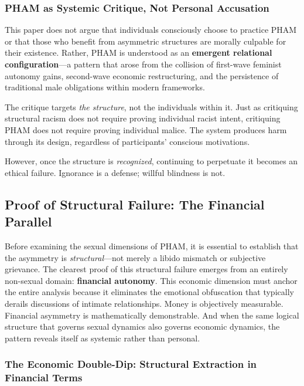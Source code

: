 \documentclass[12pt, letterpaper]{article}
\begin{document}
\subsubsection{PHAM as Systemic Critique, Not Personal Accusation}

This paper does not argue that individuals consciously choose to practice PHAM or that those who benefit from asymmetric structures are morally culpable for their existence. Rather, PHAM is understood as an \textbf{emergent relational configuration}---a pattern that arose from the collision of first-wave feminist autonomy gains, second-wave economic restructuring, and the persistence of traditional male obligations within modern frameworks.

The critique targets \textit{the structure}, not the individuals within it. Just as critiquing structural racism does not require proving individual racist intent, critiquing PHAM does not require proving individual malice. The system produces harm through its design, regardless of participants' conscious motivations.

However, once the structure is \textit{recognized}, continuing to perpetuate it becomes an ethical failure. Ignorance is a defense; willful blindness is not.

\subsection{Proof of Structural Failure: The Financial Parallel}

Before examining the sexual dimensions of PHAM, it is essential to establish that the asymmetry is \textit{structural}---not merely a libido mismatch or subjective grievance. The clearest proof of this structural failure emerges from an entirely non-sexual domain: \textbf{financial autonomy}. This economic dimension must anchor the entire analysis because it eliminates the emotional obfuscation that typically derails discussions of intimate relationships. Money is objectively measurable. Financial asymmetry is mathematically demonstrable. And when the same logical structure that governs sexual dynamics also governs economic dynamics, the pattern reveals itself as systemic rather than personal.

\subsubsection{The Economic Double-Dip: Structural Extraction in Financial Terms}
\end{document}
